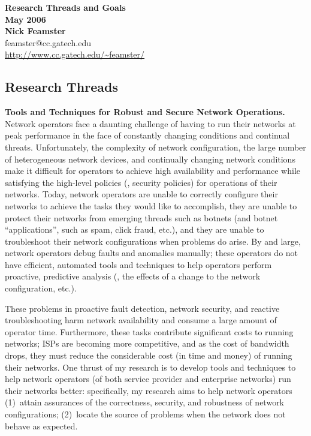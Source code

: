 \newpage \setcounter{page}{1}

\begin{center}

{\Large\textbf{Research Threads and Goals \\ May 2006}}\\[.1in]
{\large\textbf{Nick Feamster}}\\[.05in]
feamster@cc.gatech.edu \\
\url{http://www.cc.gatech.edu/~feamster/} \\[.1in]

\end{center}

\subsection*{Research Threads}

\noindent
{\bf Tools and Techniques for Robust and Secure Network Operations.}
Network operators face a daunting challenge of having to run their
networks at peak performance in the face of constantly changing
conditions and continual threats.  Unfortunately, the complexity of
network configuration, the large number of heterogeneous network
devices, and continually changing network conditions make it difficult
for operators to achieve high availability and performance while
satisfying the high-level policies (\eg, security policies) for
operations of their networks.  Today, network operators are unable to
correctly configure their networks to achieve the tasks they would like
to accomplish, they are unable to protect their networks from emerging
threads such as botnets (and botnet ``applications'', such as spam,
click fraud, etc.), and they are unable to troubleshoot their network
configurations when problems do arise.  By and large, network operators
debug faults and anomalies manually; these operators do not have
efficient, automated tools and techniques to help operators perform
proactive, predictive analysis (\eg, the effects of a change to the
network configuration, etc.).  

These problems in proactive fault detection, network security, and
reactive troubleshooting harm network availability and consume a large
amount of operator time.  Furthermore, these tasks contribute
significant costs to running networks; ISPs are becoming more
competitive, and as the cost of bandwidth drops, they must reduce the
considerable cost (in time and money) of running their networks.  One
thrust of my research is to develop tools and techniques to help network
operators (of both service provider and enterprise networks) run their
networks better: specifically, my research aims to help network
operators (1)~attain assurances of the correctness, security, and
robustness of network configurations; (2)~locate the source of problems
when the network does not behave as expected.

